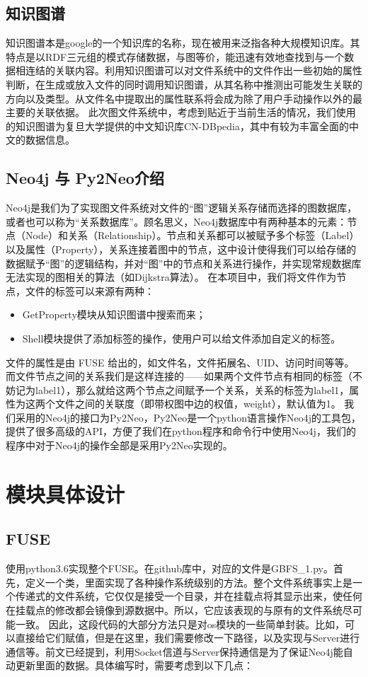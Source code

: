 \documentclass[UTF8]{ctexart}
\begin{document}
\subsection{知识图谱}
知识图谱本是google的一个知识库的名称，现在被⽤来泛指各种⼤规模知识库。其特点是以RDF三元组的模式存储数据，与图等价，能迅速有效地查找到与一个数据相连结的关联内容。利用知识图谱可以对文件系统中的文件作出一些初始的属性判断，在生成或放入文件的同时调用知识图谱，从其名称中推测出可能发生关联的方向以及类型。从文件名中提取出的属性联系将会成为除了用户手动操作以外的最主要的关联依据。
此次图文件系统中，考虑到贴近于当前生活的情况，我们使用的知识图谱为复旦大学提供的中文知识库CN-DBpedia，其中有较为丰富全面的中文的数据信息。

\subsection{Neo4j 与 Py2Neo介绍}
Neo4j是我们为了实现图文件系统对文件的“图”逻辑关系存储而选择的图数据库，或者也可以称为“关系数据库”。顾名思义，Neo4j数据库中有两种基本的元素：节点（Node）和关系（Relationship）。节点和关系都可以被赋予多个标签（Label）以及属性（Property），关系连接着图中的节点，这中设计使得我们可以给存储的数据赋予“图”的逻辑结构，并对“图”中的节点和关系进行操作，并实现常规数据库无法实现的图相关的算法（如Dijkstra算法）。
在本项目中，我们将文件作为节点，文件的标签可以来源有两种：
\begin{itemize}
	\item GetProperty模块从知识图谱中搜索而来；
	\item Shell模块提供了添加标签的操作，使用户可以给文件添加自定义的标签。
\end{itemize}
文件的属性是由 FUSE 给出的，如文件名，文件拓展名、UID、访问时间等等。
而文件节点之间的关系我们是这样连接的——如果两个文件节点有相同的标签（不妨记为label1），那么就给这两个节点之间赋予一个关系，关系的标签为label1，属性为这两个文件之间的关联度（即带权图中边的权值，weight），默认值为1。
我们采用的Neo4j的接口为Py2Neo，Py2Neo是一个python语言操作Neo4j的工具包，提供了很多高级的API，方便了我们在python程序和命令行中使用Neo4j，我们的程序中对于Neo4j的操作全部是采用Py2Neo实现的。

\section{模块具体设计}
\subsection{FUSE}
使用python3.6实现整个FUSE。在github库中，对应的文件是GBFS\_1.py。首先，定义一个类，里面实现了各种操作系统级别的方法。整个文件系统事实上是一个传递式的文件系统，它仅仅是接受一个目录，并在挂载点将其显示出来，使任何在挂载点的修改都会镜像到源数据中。所以，它应该表现的与原有的文件系统尽可能一致。
因此，这段代码的大部分方法只是对os模块的一些简单封装。比如，可以直接给它们赋值，但是在这里，我们需要修改一下路径，以及实现与Server进行通信等。前文已经提到，利用Socket信道与Server保持通信是为了保证Neo4j能自动更新里面的数据。具体编写时，需要考虑到以下几点：
\end{document}
